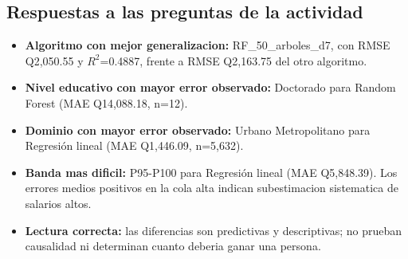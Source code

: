 \subsection{Respuestas a las preguntas de la actividad}
\begin{itemize}\setlength{\itemsep}{2pt}
\item \textbf{Algoritmo con mejor generalizacion:} RF\_50\_arboles\_d7, con RMSE Q2,050.55 y $R^2$=0.4887, frente a RMSE Q2,163.75 del otro algoritmo.
\item \textbf{Nivel educativo con mayor error observado:} Doctorado para Random Forest (MAE Q14,088.18, n=12).
\item \textbf{Dominio con mayor error observado:} Urbano Metropolitano para Regresión lineal (MAE Q1,446.09, n=5,632).
\item \textbf{Banda mas dificil:} P95-P100 para Regresión lineal (MAE Q5,848.39). Los errores medios positivos en la cola alta indican subestimacion sistematica de salarios altos.
\item \textbf{Lectura correcta:} las diferencias son predictivas y descriptivas; no prueban causalidad ni determinan cuanto deberia ganar una persona.
\end{itemize}
